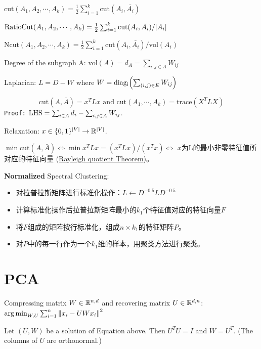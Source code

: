 \documentclass[a4paper,landscape]{article}
\begin{document}
\begin{tiny}
\begin{multicols}{4}
\begin{defi}
			$\mathrm{cut}(A_1,A_2,\cdots,A_k)=\frac{1}{2}\sum_{i=1}^k\mathrm{cut}(A_i,\bar{A_i})$

			$\mathrm{RatioCut}(A_1,A_2,\cdots,A_k)=\frac{1}{2}\sum_{i=1}^k\mathrm{cut}(A_i,\bar{A_i})/\qty|A_i|$

			$\mathrm{Ncut}(A_1,A_2,\cdots,A_k)=\frac{1}{2}\sum_{i=1}^k\mathrm{cut}(A_i,\bar{A_i})/\mathrm{vol}(A_i)$

			Degree of the subgraph A: $\mathrm{vol}(A)=d_A=\sum_{i,j\in A} W_{ij}$

			Laplacian: $L=D-W$ where $W=\mathrm{diag_i}\qty(\sum_{(i,j)\in E}W_{ij})$
		\end{defi}
		\begin{thm}
			\[
				\mathrm{cut}(A,\bar{A})=x^TLx
				\text{ and }
				\mathrm{cut}(A_1,\cdots,A_k)=\mathrm{trace}(X^TLX)
			\]
			\texttt{Proof:}
			$\text{LHS}=\sum_{i\in A}d_i-\sum_{i,j\in A}W_{ij}$.
		\end{thm}
		\begin{thm}Relaxation: $x\in \{0,1\}^\qty|V|\rightarrow\mathbb{R}^\qty|V|$.
			
			$\min \mathrm{cut}(A,\bar{A}) \iff \min x^TLx=(x^TLx)/(x^Tx) \iff$ $x$为L的最小非零特征值所对应的特征向量 (\href{https://en.wikipedia.org/wiki/Rayleigh_quotient}{Rayleigh quotient Theorem})。
		\end{thm}
		\begin{defi}\textbf{Normalized} Spectral Clustering:
			\begin{itemize}
				\item 
					对拉普拉斯矩阵进行标准化操作：$L\gets D^{-0.5}LD^{-0.5}$ 
				\item 
					计算标准化操作后拉普拉斯矩阵最小的$k_1$个特征值对应的特征向量$F$
				\item
					将$F$组成的矩阵按行标准化，组成$n\times k_1$的特征矩阵$P$。
				\item 
					对$P$中的每一行作为一个$k_1$维的样本，用聚类方法进行聚类。
			\end{itemize}
		\end{defi}

		\section{PCA}
		Compressing matrix $W\in\mathbb{R}^{n,d}$ and recovering matrix  $U\in\mathbb{R}^{d,n}$:
		$\mathop{\arg\min}_{W,U}\sum^{n}_{i=1} \norm{x_i-UWx_i}^2$

		\begin{lemma}
			Let $(U,W)$ be a solution of Equation above. Then $U^TU=I$ and  $W=U^T$. (The columns of $U$ are orthonormal.)
		\end{lemma}


\end{multicols}
\end{tiny}
\end{document}
